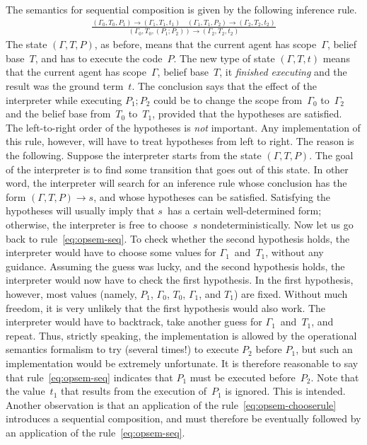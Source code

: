 \documentclass[a4paper,12pt,oneside,fleqn]{book} %
\begin{document}
The semantics for sequential composition is given by the following
inference rule.
\begin{align}
\frac
  {(\Gamma_0,T_0,P_1)\to(\Gamma_1,T_1,t_1)
  \quad
  (\Gamma_1,T_1,P_2)\to(\Gamma_2,T_2,t_2)}
  {(\Gamma_0,T_0,(P_1;P_2))\to(\Gamma_2,T_2,t_2)}
  \label{eq:opsem-seq}
\end{align}
The state $(\Gamma,T,P)$, as before, means that the current agent has
scope~$\Gamma$, belief base~$T$, and has to execute the code~$P$. The new
type of state $(\Gamma,T,t)$ means that the current agent has
scope~$\Gamma$, belief base~$T$, it \emph{finished executing} and the
result was the ground term~$t$.  The conclusion says that the effect of the
interpreter while executing $P_1;P_2$ could be to change the scope
from~$\Gamma_0$ to~$\Gamma_2$ and the belief base from~$T_0$ to~$T_1$,
provided that the hypotheses are satisfied. The left-to-right order of the
hypotheses is \emph{not} important. Any implementation of this rule,
however, will have to treat hypotheses from left to right. The reason is
the following. Suppose the interpreter starts from the state
$(\Gamma,T,P)$. The goal of the interpreter is to find some transition that
goes out of this state. In other word, the interpreter will search for an
inference rule whose conclusion has the form $(\Gamma,T,P)\to s$, and whose
hypotheses can be satisfied.  Satisfying the hypotheses will usually imply
that $s$~has a certain well-determined form; otherwise, the interpreter is
free to choose~$s$ nondeterministically. Now let us go back to
rule~\eqref{eq:opsem-seq}. To check whether the second hypothesis holds,
the interpreter would have to choose some values for $\Gamma_1$~and~$T_1$,
without any guidance.  Assuming the guess was lucky, and the second
hypothesis holds, the interpreter would now have to check the first
hypothesis. In the first hypothesis, however, most values (namely, $P_1$,
$\Gamma_0$, $T_0$, $\Gamma_1$, and $T_1$) are fixed. Without much freedom,
it is very unlikely that the first hypothesis would also work. The
interpreter would have to backtrack, take another guess for
$\Gamma_1$~and~$T_1$, and repeat. Thus, strictly speaking, the
implementation is allowed by the operational semantics formalism to try
(several times!) to execute $P_2$ before $P_1$, but such an implementation
would be extremely unfortunate. It is therefore reasonable to say that
rule~\eqref{eq:opsem-seq} indicates that $P_1$ must be executed
before~$P_2$. Note that the value~$t_1$ that results from the execution
of~$P_1$ is ignored. This is intended. Another observation is that an
application of the rule~\eqref{eq:opsem-chooserule} introduces a sequential
composition, and must therefore be eventually followed by an application of
the rule~\eqref{eq:opsem-seq}.
\end{document}
